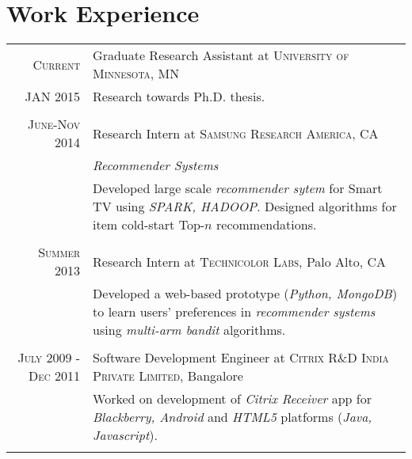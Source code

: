 \documentclass[a4paper,10pt]{article}
\begin{document}
\section{Work Experience}
\begin{tabular}{r|p{11cm}}
  
  \textsc{Current} & Graduate Research Assistant at \textsc{University of
Minnesota}, MN\\
JAN 2015  & \footnotesize{Research towards Ph.D. thesis.} \\\multicolumn{2}{c}{} \\
 

  \textsc{June-Nov 2014} & Research Intern at \textsc{Samsung Research America}, CA\\
                       &\emph{Recommender Systems}\\
                       &\footnotesize{Developed large scale \textit{recommender
                       sytem} for Smart TV using
                     \textit{SPARK, HADOOP}. Designed algorithms for 
                   item cold-start Top-$n$ recommendations.}\\\multicolumn{2}{c}{} \\

  \textsc{Summer 2013} & Research Intern at \textsc{Technicolor Labs}, Palo Alto, CA \\
                       &\footnotesize{ Developed a web-based  prototype (\emph{Python,
                 MongoDB}) to learn users'
                   preferences in \emph{recommender systems} using
               \emph{multi-arm bandit} algorithms.} \\\multicolumn{2}{c}{} \\ %

  \textsc{July 2009 - Dec 2011} & Software Development Engineer at
                \textsc{Citrix R\&D India Private Limited}, Bangalore \\
                       &\footnotesize{ Worked on development of  \emph{Citrix
                 Receiver} app for
                   \emph{Blackberry, Android}  and \emph{HTML5} platforms
                   (\emph{Java, Javascript}).
                   }\\\multicolumn{2}{c}{} \\  


\end{tabular}
\end{document}

